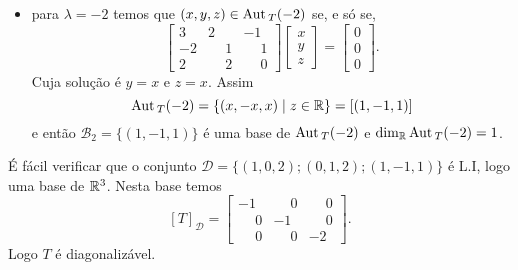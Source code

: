 \begin{exemplo}
\begin{enumerate}[label={\arabic*})]
\begin{solucao}
\begin{itemize}
\[\begin{bmatrix}
                    \end{bmatrix} = \begin{bmatrix}
                        0\\0\\0
                    \end{bmatrix}.
                \]
                Cuja solu\c{c}ão é $z = 2x + 2y$. Assim
                \[
                    \aut_T(-1) = \{(x,y,2x + 2y) \mid x,y \in \real\} = \{(x,0,2x) + (0, y, 2y) \mid x,y \in \real\} = [(1,0,2); (0, 1, 2)]
                \]
                e ent\~ao $\mathcal{B}_1 = \{(1,0,2); (0, 1, 2)\}$ \'e uma base de $\aut_T(-1)$ e $\dim_\real\aut_T(3) = 2$.

                \item para $\lambda = -2$ temos que $(x,y,z) \in {\rm Aut\,}_T(-2)$ se, e s\'o se,
                \[
                    \begin{bmatrix}
                        3 & 2 & -1\\
                        -2 & \phantom{-}1 & \phantom{-}1\\
                        2 & \phantom{-}2 & \phantom{-}0
                    \end{bmatrix}\begin{bmatrix}
                        x\\y\\z
                    \end{bmatrix} = \begin{bmatrix}
                        0\\0\\0
                    \end{bmatrix}.
                \]
                Cuja solu\c{c}ão é $y = x$ e $z = x$. Assim
                \[
                    {\rm Aut\,}_T(-2) = \{(x,-x,x) \mid z \in \mathbb{R}\} = [(1,-1,1)]
                \]
                e ent\~ao $\mathcal{B}_2 = \{(1,-1,1)\}$ \'e uma base de ${\rm Aut\,}_T(-2)$ e $\dim_{\mathbb{R}}{\rm Aut\,}_T(-2) = 1$.
            \end{itemize}
            \'E f\'acil verificar que o conjunto $\mathcal{D} = \{(1,0,2); (0,1,2); (1,-1,1)\}$ \'e L.I, logo uma base de $\mathbb{R}^3$. Nesta base temos
            \[
                [T]_\mathcal{D} = \begin{bmatrix}
                                -1 & \phantom{-}0 & \phantom{-}0\\
                                \phantom{-}0 & -1 & \phantom{-}0\\
                                \phantom{-}0 & \phantom{-}0 & -2
                            \end{bmatrix}.
            \]
            Logo $T$ \'e diagonaliz\'avel.
        \end{solucao}


\end{enumerate}
\end{exemplo}
